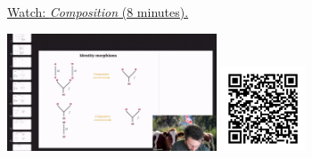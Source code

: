 
\begin{minipage}{10cm}
    \href{https://act4e-spring21.netlify.app/videos/spring2021-operads-a:composition-operad.html}{Watch: \emph{Composition} (8 minutes).}
        
    \href{https://act4e-spring21.netlify.app/videos/spring2021-operads-a:composition-operad.html}{\includegraphics[height=3.5cm]{spring2021-operads-a:composition-operad/thumbnails.jpg}}
    \href{https://act4e-spring21.netlify.app/videos/spring2021-operads-a:composition-operad.html}{\includegraphics[height=2.5cm]{spring2021-operads-a:composition-operad/qrcode.png}}
\end{minipage}
